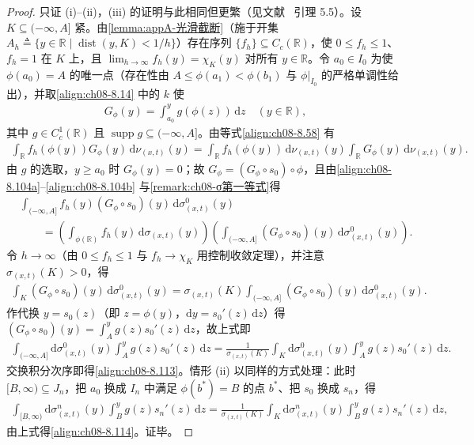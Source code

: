 \documentclass[../../main.tex]{subfiles}%
\begin{document}
\begin{proof}
只证 (i)--(ii)，(iii) 的证明与此相同但更繁（见文献~\cite{ref30} 引理 5.5）。设 $K\subseteq(-\infty,A]$ 紧。由\cref{lemma:appA-光滑截断}（施于开集 $A_h\triangleq\{y\in\mathbb{R}\mid\operatorname{dist}(y,K)<1/h\}$）存在序列 $\{f_h\}\subseteq C_c(\mathbb{R})$，使 $0\leqslant f_h\leqslant1$、$f_h=1$ 在 $K$ 上，且 $\lim_{h\to\infty}f_h(y)=\chi_K(y)$ 对所有 $y\in\mathbb{R}$。令 $a_0\in I_0$ 为使 $\phi(a_0)=A$ 的唯一点（存在性由 $A\leqslant\phi(a_1)<\phi(b_1)$ 与 $\phi|_{I_0}$ 的严格单调性给出），并取\eqref{align:ch08-8.14} 中的 $k$ 使
\begin{align*}
G_\phi(y)=\int_{a_0}^y g(\phi(z))\,\mathrm{d}z\quad(y\in\mathbb{R}),
\end{align*}
其中 $g\in C_c^1(\mathbb{R})$ 且 $\operatorname{supp}g\subseteq(-\infty,A]$。由等式\eqref{align:ch08-8.58} 有
\begin{align*}
\int_{\mathbb{R}}f_h(\phi(y))G_\phi(y)\,\mathrm{d}\nu_{(x,t)}(y)
=\int_{\mathbb{R}}f_h(\phi(y))\,\mathrm{d}\nu_{(x,t)}(y)\int_{\mathbb{R}}G_\phi(y)\,\mathrm{d}\nu_{(x,t)}(y).
\end{align*}
由 $g$ 的选取，$y\geqslant a_0$ 时 $G_\phi(y)=0$；故 $G_\phi=(G_\phi\circ s_0)\circ\phi$，且由\eqref{align:ch08-8.104a}--\eqref{align:ch08-8.104b} 与\cref{remark:ch08-σ第一等式}得
\begin{align*}
&\int_{(-\infty,A]}f_h(y)(G_\phi\circ s_0)(y)\,\mathrm{d}\sigma^0_{(x,t)}(y)\\
&\qquad=\left(\int_{\phi(\mathbb{R})}f_h(y)\,\mathrm{d}\sigma_{(x,t)}(y)\right)
\left(\int_{(-\infty,A]}(G_\phi\circ s_0)(y)\,\mathrm{d}\sigma^0_{(x,t)}(y)\right).
\end{align*}
令 $h\to\infty$（由 $0\leqslant f_h\leqslant1$ 与 $f_h\to\chi_K$ 用控制收敛定理），并注意 $\sigma_{(x,t)}(K)>0$，得
\begin{align*}
\int_K(G_\phi\circ s_0)(y)\,\mathrm{d}\sigma^0_{(x,t)}(y)
=\sigma_{(x,t)}(K)\int_{(-\infty,A]}(G_\phi\circ s_0)(y)\,\mathrm{d}\sigma^0_{(x,t)}(y).
\end{align*}
作代换 $y=s_0(z)$（即 $z=\phi(y)$，$\mathrm{d}y=s_0'(z)\,\mathrm{d}z$）得 $(G_\phi\circ s_0)(y)=\int_A^yg(z)s_0'(z)\,\mathrm{d}z$，故上式即
\begin{align*}
\int_{(-\infty,A]}\mathrm{d}\sigma^0_{(x,t)}(y)\int_A^y g(z)s_0'(z)\,\mathrm{d}z
=\frac{1}{\sigma_{(x,t)}(K)}\int_K\mathrm{d}\sigma^0_{(x,t)}(y)\int_A^y g(z)s_0'(z)\,\mathrm{d}z.
\end{align*}
交换积分次序即得\eqref{align:ch08-8.113}。情形 (ii) 以同样的方式处理：此时 $[B,\infty)\subseteq J_n$，把 $a_0$ 换成 $I_n$ 中满足 $\phi(b^*)=B$ 的点 $b^*$、把 $s_0$ 换成 $s_n$，得
\begin{align*}
\int_{[B,\infty)}\mathrm{d}\sigma^n_{(x,t)}(y)\int_B^y g(z)s_n'(z)\,\mathrm{d}z
=\frac{1}{\sigma_{(x,t)}(K)}\int_K\mathrm{d}\sigma^n_{(x,t)}(y)\int_B^y g(z)s_n'(z)\,\mathrm{d}z,
\end{align*}
由上式得\eqref{align:ch08-8.114}。证毕。
\end{proof}
\end{document}
